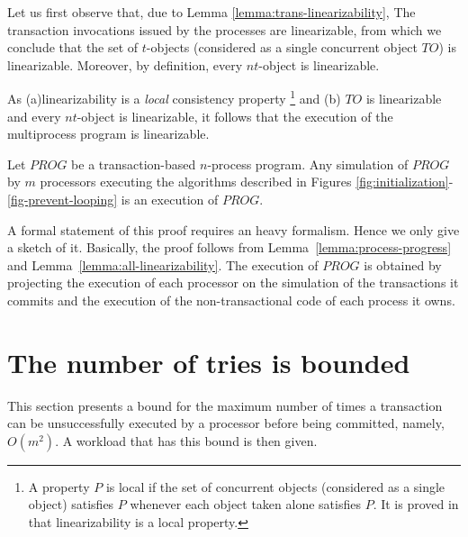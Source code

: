 \begin{proofL}
Let us first observe that, due to Lemma \ref{lemma:trans-linearizability},
The transaction invocations issued  by the processes are linearizable, from
which we conclude that the set of $t$-objects (considered as a single 
concurrent object $TO$) is linearizable. 
Moreover, by  definition, every $nt$-object is linearizable. 


As (a)linearizability is a {\it local} consistency property 
\cite{HW90}\footnote{A  property $P$  is  local if  the  set of  concurrent
objects (considered as a single object)
satisfies $P$  whenever each object taken alone  satisfies $P$. It is
proved in \cite{HW90}  that linearizability is a local  property.} and (b) 
 $TO$  is linearizable and  every $nt$-object  is linearizable,  it  follows
that the  execution of the multiprocess program is linearizable.  
\renewcommand{\toto}{lemma:all-linearizability}
\end{proofL}




\begin{theorem}
\label{theorem:main}
Let $\mathit{PROG}$ be a transaction-based $n$-process program. 
Any simulation of $\mathit{PROG}$ by $m$ processors executing the algorithms 
described in Figures \ref{fig:initialization}-\ref{fig-prevent-looping}
is an execution of  $\mathit{PROG}$. 
\end{theorem}

\begin{proofT}
A formal statement of this proof  requires an heavy  formalism. Hence we 
only give a sketch of it. Basically, the  proof follows from 
Lemma~\ref{lemma:process-progress} and Lemma~\ref{lemma:all-linearizability}. 
The execution of $\mathit{PROG}$ is obtained by projecting  the execution 
of each  processor on the simulation of the transactions it commits and 
the execution of the non-transactional code of each process it owns. 
\renewcommand{\toto}{theorem:main}
\end{proofT}



\section{The number of tries is bounded}
\label{sec:bounded-tries}
This section presents a bound  for the maximum number of times a transaction
can  be unsuccessfully executed by a  processor before  being  committed,
namely, $O(m^2)$. A  workload that has this bound is then given. 


